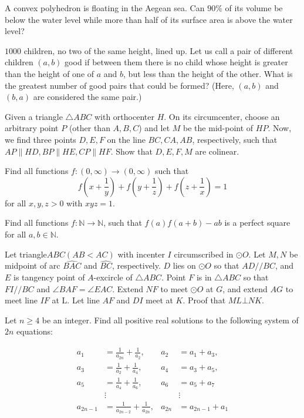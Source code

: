 \documentclass[11pt]{scrartcl}
\begin{document}
\begin{problem}[241697479443718]
  A convex polyhedron is floating in the Aegean sea.
  Can $90 \%$ of its volume be below the water level
  while more than half of its surface area is above the water level?
\end{problem}
\begin{problem}[181878217485192]
$1000$ children, no two of the same height, lined up. Let us call a pair of different children $(a,b)$ good if between them there is no child whose height is greater than the height of one of $a$ and $b$, but less than the height of the other. What is the greatest number of good pairs that could be formed? (Here, $(a,b)$ and $(b,a)$ are considered the same pair.)
\end{problem}
\begin{problem}[296367141382799]
Given a triangle $ \triangle{ABC} $ with orthocenter $ H $. On its circumcenter, choose an arbitrary point $ P $ (other than $ A,B,C $) and let $ M $ be the mid-point of $ HP $. Now, we find three points $ D,E,F $ on the line $ BC, CA, AB $, respectively, such that $ AP \parallel HD, BP \parallel HE, CP \parallel HF $. Show that $ D, E, F, M $ are colinear.
\end{problem}
\begin{problem}[3626448942281457521]
	Find all functions $f:(0,\infty) \rightarrow (0,\infty)$ such that\[f\left(x+\frac{1}{y}\right)+f\left(y+\frac{1}{z}\right) + f\left(z+\frac{1}{x}\right) = 1\]for all $x,y,z >0$ with $xyz =1$.
\end{problem}
\begin{problem}[2583236079961296677]
	Find all functions $f:\mathbb{N} \rightarrow \mathbb{N}$, such that $f(a)f(a+b)-ab$ is a perfect square for all $a, b \in \mathbb{N}$.
\end{problem}
\begin{problem}[239934686230450]
Let triangle$ABC(AB<AC)$ with incenter $I$ circumscribed in $\odot O$. Let $M,N$ be midpoint of arc $\widehat{BAC}$ and $\widehat{BC}$, respectively. $D$ lies on $\odot O$ so that $AD//BC$, and $E$ is tangency point of $A$-excircle of $\bigtriangleup ABC$. Point $F$ is in $\bigtriangleup ABC$ so that $FI//BC$ and $\angle BAF=\angle EAC$. Extend $NF$ to meet $\odot O$ at $G$, and extend $AG$ to meet line $IF$ at L. Let line $AF$ and $DI$ meet at $K$. Proof that $ML\bot NK$.
\end{problem}
\begin{problem}[4835329555526569551]
Let $n \geq 4$ be an integer. Find all positive real solutions to the following system of $2n$ equations:

\begin{align*}
a_{1} &=\frac{1}{a_{2 n}}+\frac{1}{a_{2}}, & a_{2}&=a_{1}+a_{3}, \\
a_{3}&=\frac{1}{a_{2}}+\frac{1}{a_{4}}, & a_{4}&=a_{3}+a_{5}, \\
a_{5}&=\frac{1}{a_{4}}+\frac{1}{a_{6}}, & a_{6}&=a_{5}+a_{7} \\
&\vdots & &\vdots \\
a_{2 n-1}&=\frac{1}{a_{2 n-2}}+\frac{1}{a_{2 n}}, & a_{2 n}&=a_{2 n-1}+a_{1}
\end{align*}
\end{problem}
\end{document}
